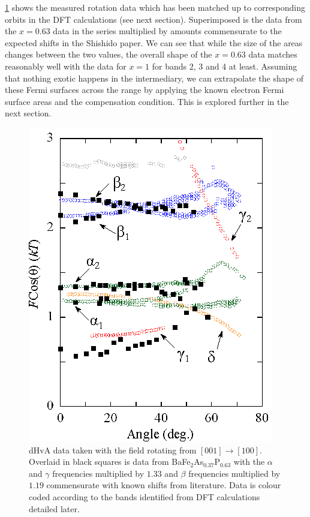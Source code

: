 \Fig\ref{Fig:ResD:SubstitutionComparison} shows the measured rotation data which has been matched up to corresponding orbits in the DFT calculations (see next section). Superimposed is the data from the $x=0.63$ data in the \BaFePAs series multiplied by amounts commensurate to the expected shifts in the Shishido paper\cite{Shishido2010}. We can see that while the size of the areas changes between the two values, the overall shape of the $x=0.63$ data matches reasonably well with the data for $x=1$ for bands 2, 3 and 4 at least. Assuming that nothing exotic happens in the intermediary, we can extrapolate the shape of these Fermi surfaces across the range by applying the known electron Fermi surface areas and the compensation condition. This is explored further in the next section.
\begin{figure}
    \begin{center}
        \includegraphics[scale=0.9]{Chapter-dHvABaFe2P2/Figures/AngleDepMeasurements/SubstitutionComparison/SubstitutionComparison}
        \caption{dHvA data taken with the field rotating from $[001]\rightarrow[100]$. Overlaid in black squares is data from BaFe$_2$As$_{0.37}$P$_{0.63}$\cite{Analytis2010c} with the $\alpha$ and $\gamma$ frequencies multiplied by $1.33$ and $\beta$ frequencies multiplied by $1.19$ commensurate with known shifts from literature. Data is colour coded according to the bands identified from DFT calculations detailed later.}
        \label{Fig:ResD:SubstitutionComparison}
    \end{center}
\end{figure}

